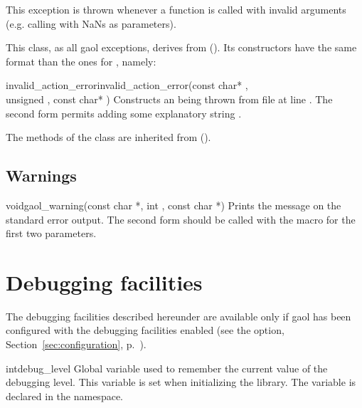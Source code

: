 \documentclass{manual}
\begin{document}
This exception is thrown whenever a function is called with invalid arguments
(e.g. calling  with NaNs as parameters).

This class, as all gaol exceptions, derives from 
(). Its constructors have the same format
than the ones for , namely:

\begin{defmethod}{invalid\_action\_error}{}{invalid\_action\_error}{(const char* ,\\\hbox{}\hfill  unsigned , const char* )}
Constructs an  being thrown from file  at
line . The second form permits adding some explanatory string .
\end{defmethod}

The methods of the class are inherited from  ().


\section{Warnings}

\begin{deffun}{void}{gaol\_warning}{(const char *, int , const char *)}
Prints the message  on the standard error output. The second form
should be called with the  macro for the first two parameters.
\end{deffun}

\chapter{Debugging facilities}\label{sec:debugging-facilities}

The debugging facilities described hereunder are available only if
gaol has been configured with the debugging facilities enabled (see
the  option, Section~\ref{sec:configuration},
p.~\pageref{sec:configuration}).

\begin{deffun}{int}{debug\_level}{}
  Global variable used to remember the current value of the debugging
  level.  This variable is set when initializing the library. The
  variable is declared in the  namespace.
\end{deffun}
\end{document}
